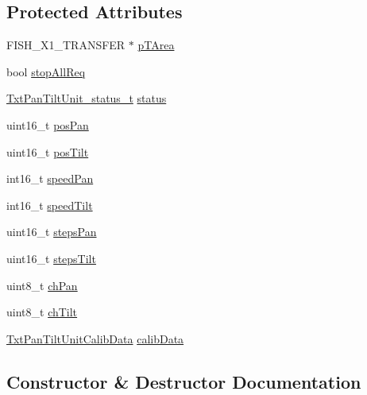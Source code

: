 \subsection*{Protected Attributes}
\begin{DoxyCompactItemize}
\item 
F\+I\+S\+H\+\_\+\+X1\+\_\+\+T\+R\+A\+N\+S\+F\+ER $\ast$ \hyperlink{classft_1_1_txt_pan_tilt_unit_a0980755f4b1e238ff65ce3799133a1cd}{p\+T\+Area}
\item 
bool \hyperlink{classft_1_1_txt_pan_tilt_unit_a5d3760c33a938591211de2606909bc90}{stop\+All\+Req}
\item 
\hyperlink{namespaceft_aaf50a06f05b9188eeec535212b261df0}{Txt\+Pan\+Tilt\+Unit\+\_\+status\+\_\+t} \hyperlink{classft_1_1_txt_pan_tilt_unit_aa1341a261f7ce640d23c7576d1883791}{status}
\item 
uint16\+\_\+t \hyperlink{classft_1_1_txt_pan_tilt_unit_a876531ddce0bea36cd00710dc7a620be}{pos\+Pan}
\item 
uint16\+\_\+t \hyperlink{classft_1_1_txt_pan_tilt_unit_a6b4f35838b92cdd1ecf3436de245a06b}{pos\+Tilt}
\item 
int16\+\_\+t \hyperlink{classft_1_1_txt_pan_tilt_unit_a45cc586654a8b089afeb54bdff8c9073}{speed\+Pan}
\item 
int16\+\_\+t \hyperlink{classft_1_1_txt_pan_tilt_unit_a80cf8951bbdc1f84caccb7425802edb0}{speed\+Tilt}
\item 
uint16\+\_\+t \hyperlink{classft_1_1_txt_pan_tilt_unit_abf2f9ae19a026abf403bb8e6878ff0d8}{steps\+Pan}
\item 
uint16\+\_\+t \hyperlink{classft_1_1_txt_pan_tilt_unit_ae350fb86cc91154a2c699621b672b5bd}{steps\+Tilt}
\item 
uint8\+\_\+t \hyperlink{classft_1_1_txt_pan_tilt_unit_a1a565a8918d7e9ca3dd33280a20c32dc}{ch\+Pan}
\item 
uint8\+\_\+t \hyperlink{classft_1_1_txt_pan_tilt_unit_acddd9fc227b70c060fb5816870677101}{ch\+Tilt}
\item 
\hyperlink{classft_1_1_txt_pan_tilt_unit_calib_data}{Txt\+Pan\+Tilt\+Unit\+Calib\+Data} \hyperlink{classft_1_1_txt_pan_tilt_unit_ada1d4f80e531ca6c1f4d63238443cbcf}{calib\+Data}
\end{DoxyCompactItemize}


\subsection{Constructor \& Destructor Documentation}
